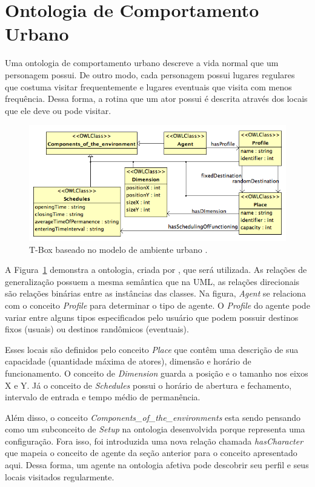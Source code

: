 \section{Ontologia de Comportamento Urbano} \label{ch:aec:ocu}

Uma ontologia de comportamento urbano descreve a vida normal que um personagem
possui. De outro modo, cada personagem possui lugares regulares que costuma
visitar frequentemente e lugares eventuais que visita com menos frequência.
Dessa forma, a rotina que um ator possui é descrita através dos locais que ele
deve ou pode visitar.

\begin{figure}
  \centering
    \includegraphics[width=150mm]{figuras/uem-tbox.png}
  \caption[T-Box baseado no modelo de ambiente urbano.]{T-Box baseado no modelo de ambiente urbano \cite{paiva2005ontology}.}
  \label{fig:UEM:TBOX}
\end{figure}

A Figura~\ref{fig:UEM:TBOX} demonstra a ontologia, criada por
\citet{paiva2005ontology}, que será utilizada. As relações de generalização
possuem a mesma semântica que na UML, as relações direcionais são relações
binárias entre as instâncias das classes. Na figura, \emph{Agent} se relaciona
com o conceito \emph{Profile} para determinar o tipo de agente. O
\emph{Profile} do agente pode variar entre alguns tipos especificados pelo
usuário que podem possuir destinos fixos (usuais) ou destinos randômicos
(eventuais).

Esses locais são definidos pelo conceito \emph{Place} que contêm
uma descrição de sua capacidade (quantidade máxima de atores), dimensão
e horário de funcionamento. O conceito de \emph{Dimension} guarda a posição e
o tamanho nos eixos X e Y. Já o conceito de \emph{Schedules} possui o horário
de abertura e fechamento, intervalo de entrada e tempo médio de permanência.

Além disso, o conceito \emph{Components\_of\_the\_environments} esta sendo
pensando como um subconceito de \emph{Setup} na ontologia
desenvolvida porque representa uma configuração.
Fora isso, foi introduzida uma nova relação chamada \emph{hasCharacter} que
mapeia o conceito de agente da seção anterior para o conceito apresentado
aqui. Dessa forma, um agente na ontologia afetiva pode descobrir seu perfil e
seus locais visitados regularmente.

